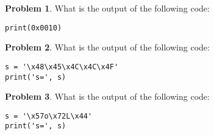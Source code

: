 \documentclass[10pt]{article}
\theoremstyle{definition}
\newtheorem{problem}{Problem}
\newcommand{\x}{\mathbf x}
\begin{document}
\begin{problem}
    What is the output of the following code:
\end{problem}
\begin{lstlisting}
print(0x0010)
\end{lstlisting}
\vspace{1.5in}

\begin{problem}
    What is the output of the following code:
\end{problem}
\begin{lstlisting}
s = '\x48\x45\x4C\x4C\x4F'
print('s=', s)
\end{lstlisting}
\vspace{1.5in}

\begin{problem}
    What is the output of the following code:
\end{problem}
\begin{lstlisting}
s = '\x57o\x72L\x44'
print('s=', s)
\end{lstlisting}
\vspace{1.5in}
\end{document}
